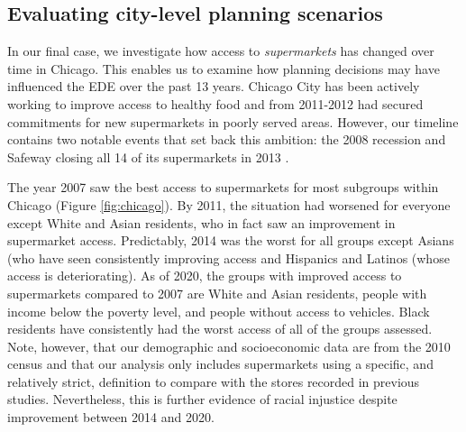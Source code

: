 \documentclass[final,3p,times,onecolumn,sort&compress]{elsarticle}
\begin{document}
\subsection{Evaluating city-level planning scenarios}
In our final case, we investigate how access to \textit{supermarkets} has changed over time in Chicago.
This enables us to examine how planning decisions may have influenced the EDE over the past 13 years.
Chicago City has been actively working to improve access to healthy food \citep{cdph2012-si} and from 2011-2012 had secured commitments for new supermarkets in poorly served areas.
However, our timeline contains two notable events that set back this ambition:
the 2008 recession and Safeway closing all 14 of its supermarkets in 2013 \citep{Kolak2018-az}.

The year 2007 saw the best access to supermarkets for most subgroups within Chicago (Figure \ref{fig:chicago}).
By 2011, the situation had worsened for everyone except White and Asian residents, who in fact saw an improvement in supermarket access. 
Predictably, 2014 was the worst for all groups except Asians (who have seen consistently improving access and Hispanics and Latinos (whose access is deteriorating). 
As of 2020, the groups with improved access to supermarkets compared to 2007 are White and Asian residents, people with income below the poverty level, and people without access to vehicles.
Black residents have consistently had the worst access of all of the groups assessed.
Note, however, that our demographic and socioeconomic data are from the 2010 census and that our analysis only includes supermarkets using a specific, and relatively strict, definition to compare with the stores recorded in previous studies.
Nevertheless, this is further evidence of racial injustice despite improvement between 2014 and 2020.
\end{document}
